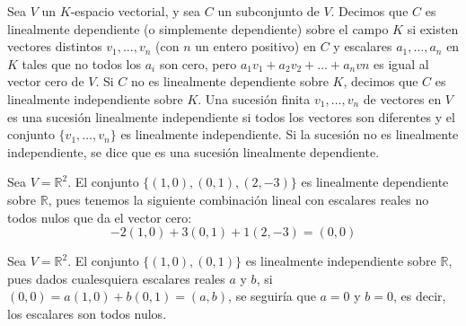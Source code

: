 \begin{definition}
Sea \( V \) un \( K \)-espacio vectorial, y sea \( C \) un subconjunto de \( V \). Decimos que \( C \) es linealmente dependiente (o simplemente dependiente) sobre el campo \( K \) si existen vectores distintos \( v_1, \ldots, v_n \) (con \( n \) un entero positivo) en \( C \) y escalares \( a_1, \ldots, a_n \) en \( K \) tales que no todos los \( a_i \) son cero, pero \( a_1v_1 + a_2v_2 + \ldots + a_nvn \) es igual al vector cero de \( V \). Si \( C \) no es linealmente dependiente sobre \( K \), decimos que \( C \) es linealmente independiente sobre \( K \). Una sucesión finita \( v_1, \ldots, v_n \) de vectores en \( V \) es una sucesión linealmente independiente si todos los vectores son diferentes y el conjunto \( \{v_1, \ldots, v_n\} \) es linealmente independiente. Si la sucesión no es linealmente independiente, se dice que es una sucesión linealmente dependiente.
\end{definition}
\begin{example}
Sea \( V = \mathbb{R}^2 \). El conjunto \( \{(1, 0), (0, 1), (2, -3)\} \) es linealmente dependiente sobre \( \mathbb{R} \), pues tenemos la siguiente combinación lineal con escalares reales no todos nulos que da el vector cero:
\[ -2(1, 0) + 3(0, 1) + 1(2, -3) = (0, 0) \]    
\end{example}
\begin{example}
 Sea \( V = \mathbb{R}^2 \). El conjunto \( \{(1, 0), (0, 1)\} \) es linealmente independiente sobre \( \mathbb{R} \), pues dados cualesquiera escalares reales \( a \) y \( b \), si \( (0, 0) = a(1, 0) + b(0, 1) = (a, b) \), se seguiría que \( a = 0 \) y \( b = 0 \), es decir, los escalares son todos nulos.
   
\end{example}
